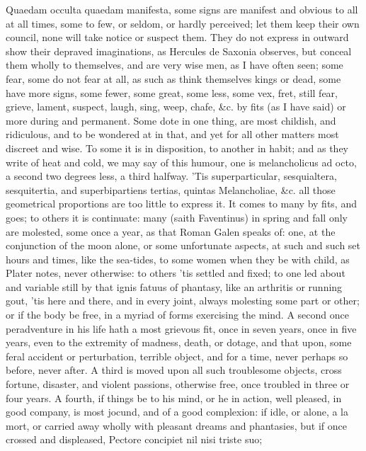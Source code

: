 {Quaedam occulta quaedam manifesta, some signs are manifest and
obvious to all at all times, some to few, or seldom, or hardly
perceived; let them keep their own council, none will take notice or
suspect them. They do not express in outward show their depraved
imaginations, as Hercules de Saxonia observes, but conceal them
wholly to themselves, and are very wise men, as I have often seen; some
fear, some do not fear at all, as such as think themselves kings or
dead, some have more signs, some fewer, some great, some less, some
vex, fret, still fear, grieve, lament, suspect, laugh, sing, weep,
chafe, \&c. by fits (as I have said) or more during and permanent. Some
dote in one thing, are most childish, and ridiculous, and to be
wondered at in that, and yet for all other matters most discreet and
wise. To some it is in disposition, to another in habit; and as they
write of heat and cold, we may say of this humour, one is melancholicus
ad octo, a second two degrees less, a third halfway. 'Tis
superparticular, sesquialtera, sesquitertia, and superbipartiens
tertias, quintas Melancholiae, \&c. all those geometrical proportions
are too little to express it. It comes to many by fits, and goes;
to others it is continuate: many (saith Faventinus) in spring and
fall only are molested, some once a year, as that Roman  Galen
speaks of: one, at the conjunction of the moon alone, or some
unfortunate aspects, at such and such set hours and times, like the
sea-tides, to some women when they be with child, as Plater
notes, never otherwise: to others 'tis settled and fixed; to one led
about and variable still by that ignis fatuus of phantasy, like an
arthritis or running gout, 'tis here and there, and in every joint,
always molesting some part or other; or if the body be free, in a
myriad of forms exercising the mind. A second once peradventure in his
life hath a most grievous fit, once in seven years, once in five years,
even to the extremity of madness, death, or dotage, and that upon, some
feral accident or perturbation, terrible object, and for a time, never
perhaps so before, never after. A third is moved upon all such
troublesome objects, cross fortune, disaster, and violent passions,
otherwise free, once troubled in three or four years. A fourth, if
things be to his mind, or he in action, well pleased, in good company,
is most jocund, and of a good complexion: if idle, or alone, a la mort,
or carried away wholly with pleasant dreams and phantasies, but if once
crossed and displeased,
Pectore concipiet nil nisi triste suo;

}
